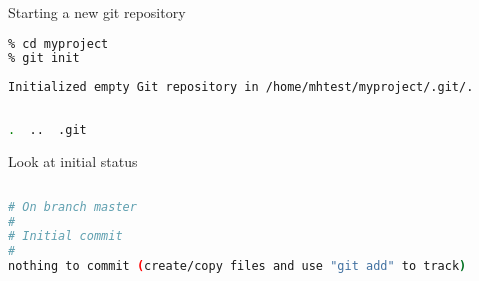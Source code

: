 \documentclass{beamer}
\begin{document}
\begin{frame}[fragile]
\begin{block}{Starting a new git repository}
\begin{lstlisting}[language=bash,basicstyle=\ttfamily\scriptsize]
% mkdir myproject
% cd myproject
% git init
\end{lstlisting}

\begin{lstlisting}[language=bash,basicstyle=\sl\ttfamily\scriptsize,breaklines=true]
Initialized empty Git repository in /home/mhtest/myproject/.git/.
\end{lstlisting}

\begin{lstlisting}[language=bash,basicstyle=\ttfamily\scriptsize,breaklines=true]
% ls -a
\end{lstlisting}

\begin{lstlisting}[language=bash,basicstyle=\sl\ttfamily\scriptsize]
.  ..  .git
\end{lstlisting}

\end{block}
\end{frame}



\begin{frame}[fragile]
\begin{block}{Look at initial status}
\begin{lstlisting}[language=bash,basicstyle=\ttfamily\scriptsize]
% git status
\end{lstlisting}
\begin{lstlisting}[language=bash,basicstyle=\sl\ttfamily\scriptsize,breaklines=true]
# On branch master
#
# Initial commit
#
nothing to commit (create/copy files and use "git add" to track)

\end{lstlisting}
\end{block}
\end{frame}
\end{document}

